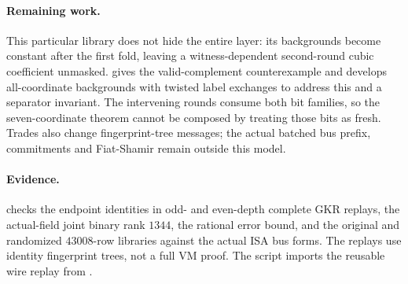 \documentclass[11pt]{article}
\begin{document}
\paragraph{Remaining work.} This particular library does not hide the entire layer: its backgrounds become constant after the first fold, leaving a witness-dependent second-round cubic coefficient unmasked.  gives the valid-complement counterexample and develops all-coordinate backgrounds with twisted label exchanges to address this and a separator invariant. The intervening rounds consume both bit families, so the seven-coordinate theorem cannot be composed by treating those bits as fresh. Trades also change fingerprint-tree messages; the actual batched bus prefix, commitments and Fiat-Shamir remain outside this model.

\paragraph{Evidence.}  checks the endpoint identities in odd- and even-depth complete GKR replays, the actual-field joint binary rank $1344$, the rational error bound, and the original and randomized $43008$-row libraries against the actual ISA bus forms. The replays use identity fingerprint trees, not a full VM proof. The script imports the reusable wire replay from .
\end{document}
